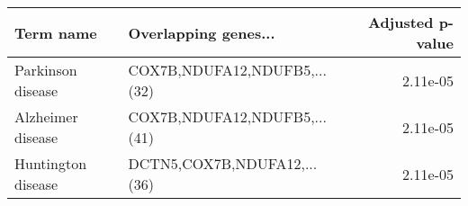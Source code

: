 \begin{tabular}{llr}
\toprule
         Term name &         Overlapping genes... &  Adjusted p-value \\
\midrule
 Parkinson disease & COX7B,NDUFA12,NDUFB5,...(32) &          2.11e-05 \\
 Alzheimer disease & COX7B,NDUFA12,NDUFB5,...(41) &          2.11e-05 \\
Huntington disease &  DCTN5,COX7B,NDUFA12,...(36) &          2.11e-05 \\
\bottomrule
\end{tabular}
